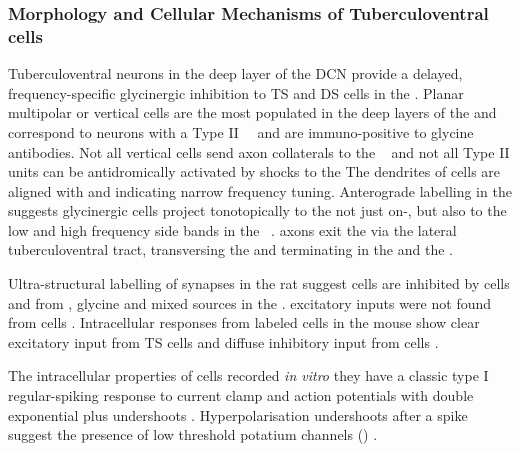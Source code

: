 

\subsubsection{Morphology and Cellular Mechanisms of Tuberculoventral cells}

Tuberculoventral neurons in the deep layer of the DCN provide a delayed,
frequency-specific glycinergic inhibition to TS and DS cells in the \VCN
\citep{ZhangOertel:1993,WickesbergOertel:1988}.  Planar multipolar or vertical
cells are the most populated in the deep layers of the \DCN and correspond to
neurons with a Type II~\EIRA~\citep{SpirouDavisEtAl:1999,Rhode:1999} and are
immuno-positive to glycine antibodies.  Not all vertical cells send axon
collaterals to the \VCN~\citep{Rhode:1999} and not all Type II units can be
antidromically activated by shocks to the \VCN The dendrites of \TV cells are
aligned with \ANFs and indicating narrow frequency tuning.  Anterograde
labelling in the \DCN suggests glycinergic \TV cells project tonotopically to the
\VCN not just on-\CF, but also to the low and high frequency side bands in the
\AVCN~\citep{WickesbergOertel:1993,WickesbergOertel:1988,WickesbergWhitlonEtAl:1991,Wickesberg:1996,OstapoffFengEtAl:1994,MunirathinamOstapoffEtAl:2004}.
\TV axons exit the \DCN via the lateral tuberculoventral tract, transversing the
\GCD and terminating in the \PVCN and the \AVCN.


Ultra-structural labelling of synapses in the rat \DCN suggest \TV cells are
inhibited by \DS cells and from \GABA, glycine and mixed sources in the \DCN
\citep{RubioJuiz:2004}.  excitatory inputs were not found from \TS cells
\citep{RubioJuiz:2004}.  Intracellular responses from labeled \TV cells in the
mouse show clear excitatory input from TS cells and diffuse inhibitory input
from \DS cells \citep{ZhangOertel:1993}.



The intracellular properties of \TV cells recorded \textit{in vitro} they have a
classic type I regular-spiking response to current clamp and action potentials
with double exponential plus undershoots
\citep{EvansNelson:1973,WickesbergOertel:1990,YoungBrownell:1976,YoungVoigt:1981,ZhangOertel:1993}.
Hyperpolarisation undershoots after a spike suggest the presence of low
threshold potatium channels (\IKLT) \citep{ManisMarx:1991,RothmanManis:2003}.



